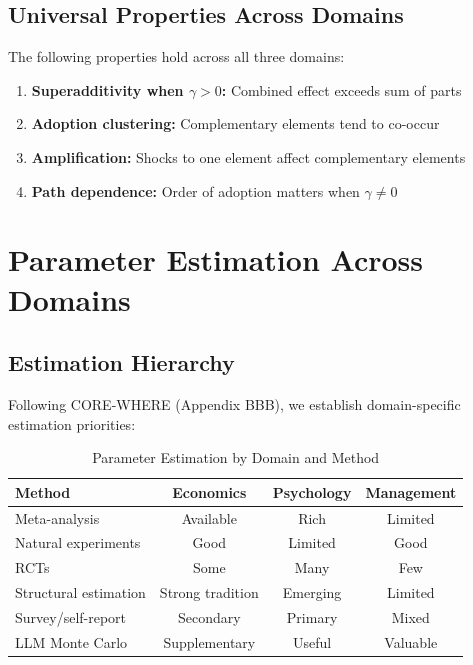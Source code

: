 \subsection{Universal Properties Across Domains}

\begin{theorem}
The following properties hold across all three domains:
\begin{enumerate}
    \item \textbf{Superadditivity when $\gamma > 0$:} Combined effect exceeds sum of parts
    \item \textbf{Adoption clustering:} Complementary elements tend to co-occur
    \item \textbf{Amplification:} Shocks to one element affect complementary elements
    \item \textbf{Path dependence:} Order of adoption matters when $\gamma \neq 0$
\end{enumerate}
\end{theorem}

\section{Parameter Estimation Across Domains}
\label{sec:parameters}

\subsection{Estimation Hierarchy}

Following CORE-WHERE (Appendix BBB), we establish domain-specific estimation priorities:

\begin{table}[h]
\centering
\caption{Parameter Estimation by Domain and Method}
\label{tab:estimation}
\renewcommand{\arraystretch}{1.3}
\small
\begin{tabular}{@{}lccc@{}}
\toprule
\textbf{Method} & \textbf{Economics} & \textbf{Psychology} & \textbf{Management} \\
\midrule
Meta-analysis & Available & Rich & Limited \\
Natural experiments & Good & Limited & Good \\
RCTs & Some & Many & Few \\
Structural estimation & Strong tradition & Emerging & Limited \\
Survey/self-report & Secondary & Primary & Mixed \\
LLM Monte Carlo & Supplementary & Useful & Valuable \\
\bottomrule
\end{tabular}
\end{table}

